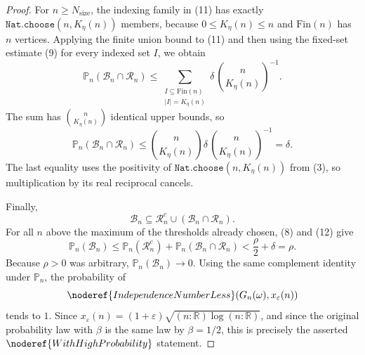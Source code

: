 \begin{proof}
For \(n\ge N_{\mathrm{size}}\), the indexing family in (11) has exactly
\(\texttt{Nat.choose}(n,K_\eta(n))\) members, because \(0\le K_\eta(n)\le n\)
and \(\mathrm{Fin}(n)\) has \(n\) vertices.  Applying the finite union bound to
(11) and then using the fixed-set estimate (9) for every indexed set \(I\), we
obtain
\[
\mathbb P_n(\mathcal B_n\cap\mathcal R_n)
\le
\sum_{\substack{I\subseteq \mathrm{Fin}(n)\\ |I|=K_\eta(n)}}
\delta\,\binom{n}{K_\eta(n)}^{-1}.
\]
The sum has \(\binom{n}{K_\eta(n)}\) identical upper bounds, so
\[
\mathbb P_n(\mathcal B_n\cap\mathcal R_n)
\le
\binom{n}{K_\eta(n)}
\delta\,\binom{n}{K_\eta(n)}^{-1}
=\delta. \tag{12}
\]
The last equality uses the positivity of
\(\texttt{Nat.choose}(n,K_\eta(n))\) from (3), so multiplication by its real
reciprocal cancels.

Finally,
\[
\mathcal B_n\subseteq \mathcal R_n^c\cup(\mathcal B_n\cap\mathcal R_n).
\]
For all \(n\) above the maximum of the thresholds already chosen, (8) and (12)
give
\[
\mathbb P_n(\mathcal B_n)
\le
\mathbb P_n(\mathcal R_n^c)+\mathbb P_n(\mathcal B_n\cap\mathcal R_n)
<\frac{\rho}{2}+\delta
=\rho.
\]
Because \(\rho>0\) was arbitrary, \(\mathbb P_n(\mathcal B_n)\to0\).  Using the
same complement identity under \(\mathbb P_n\), the probability of
\[
\noderef{IndependenceNumberLess}(G_n(\omega),x_\varepsilon(n))
\]
tends to \(1\).  Since \(x_\varepsilon(n)=(1+\varepsilon)
\sqrt{(n:\mathbb R)\log(n:\mathbb R)}\), and since the original probability
law with \(\beta\) is the same law by \(\beta=1/2\), this is precisely the
asserted \(\noderef{WithHighProbability}\) statement.
\end{proof}
